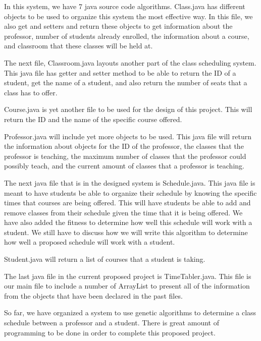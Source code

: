 \documentclass{article}
\begin{document}
\par
In this system, we have 7 java source code algorithms. Class.java has different objects to be used to organize this system the most effective way. In this file, we also get and setters and return these objects to get information about the professor, number of students already enrolled, the information about a course, and classroom that these classes will be held at.
\par
The next file, Classroom.java layouts another part of the class scheduling system. This java file has getter and setter method to be able to return the ID of a student, get the name of a student, and also return the number of seats that a class has to offer.
\par
Course.java is yet another file to be used for the design of this project. This will return the ID and the name of the specific course offered. 
\par
Professor.java will include yet more objects to be used. This java file will return the information about objects for the ID of the professor, the classes that the professor is teaching, the maximum number of classes that the professor could possibly teach, and the current amount of classes that a professor is teaching.
\par
The next java file that is in the designed system is Schedule.java. This java file is meant to have students be able to organize their schedule by knowing the specific times that courses are being offered. This will have students be able to add and remove classes from their schedule given the time that it is being offered. We have also added the fitness to determine how well this schedule will work with a student. We still have to discuss how we will write this algorithm to determine how well a proposed schedule will work with a student.
\par
Student.java will return a list of courses that a student is taking.
\par
The last java file in the current proposed project is TimeTabler.java. This file is our main file to include a number of ArrayList to present all of the information from the objects that have been declared in the past files.
\par
So far, we have organized a system to use genetic algorithms to determine a class schedule between a professor and a student. There is great amount of programming to be done in order to complete this proposed project.
  
\end{document}
